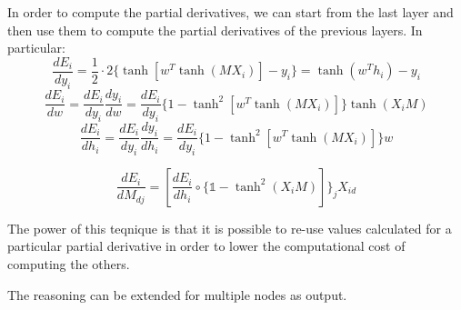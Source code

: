 In order to compute the partial derivatives, we can start from the last layer and then use them to compute
the partial derivatives of the previous layers.
In particular:
$$ \frac{dE_i}{dy_i} = \frac{1}{2} \cdot 2 \{ \tanh[w^T \tanh(M X_i)] - y_i\} = \tanh(w^T h_i) - y_i $$
$$ \frac{dE_i}{dw} = \frac{dE_i}{dy_i} \frac{dy_i}{dw} = \frac{dE_i}{dy_i} \{1 - \tanh^2[w^T \tanh(M X_i)]\} \tanh(X_i M) $$
$$ \frac{dE_i}{dh_i} = \frac{dE_i}{dy_i} \frac{dy_i}{dh_i} = \frac{dE_i}{dy_i} \{1 - \tanh^2[w^T \tanh(M X_i)]\} w $$

$$ \frac{dE_i}{dM_{dj}} = [\frac{dE_i}{dh_i} \circ \{\mathbb{1} - \tanh^2(X_i M)]\}_j X_{id}$$

The power of this teqnique is that it is possible to re-use values calculated for a particular partial derivative in order to lower the computational cost of computing the others.

The reasoning can be extended for multiple nodes as output.